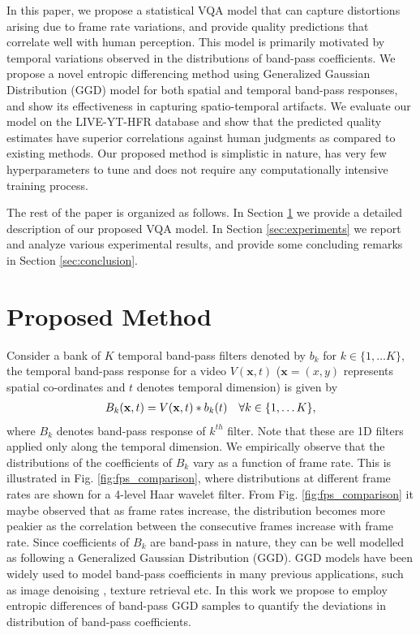 \documentclass[journal]{IEEEtran}
\begin{document}
In this paper, we propose a statistical VQA model that can capture distortions arising due to frame rate variations, and provide quality predictions that correlate well with human perception. This model is primarily motivated by temporal variations observed in the distributions of band-pass coefficients. We propose a novel entropic differencing method using Generalized Gaussian Distribution (GGD) model for both spatial and temporal band-pass responses, and show its effectiveness in capturing spatio-temporal artifacts. We evaluate our model on the LIVE-YT-HFR database and show that the predicted quality estimates have superior correlations against human judgments as compared to existing methods. Our proposed method is simplistic in nature, has very few hyperparameters to tune and does not require any computationally intensive training process. 

The rest of the paper is organized as follows. In Section \ref{sec:Objective_QA} we provide a detailed description of our proposed VQA model. In Section \ref{sec:experiments} we report and analyze various experimental results, and provide some concluding remarks in Section \ref{sec:conclusion}.

\section{Proposed Method}
\label{sec:Objective_QA}

Consider a bank of $K$ temporal band-pass filters denoted by $b_k$ for $k \in \{1,\ldots K\}$, the temporal band-pass response for a video $V(\mathbf{x},t)$ ($\mathbf{x} = (x,y)$ represents spatial co-ordinates and $t$ denotes temporal dimension) is given by
\begin{align}
    B_k(\mathbf{x},t) = V(\mathbf{x},t)*b_k(t) \text{\hspace{10pt}} \forall k \in \{1,\ldots K\},
\end{align}
where $B_k$ denotes band-pass response of $k^{th}$ filter. Note that these are 1D filters applied only along the temporal dimension. We empirically observe that the distributions of the coefficients of $B_k$ vary as a function of frame rate. This is illustrated in Fig. \ref{fig:fps_comparison}, where distributions at different frame rates are shown for a 4-level Haar wavelet filter. From Fig. \ref{fig:fps_comparison} it maybe observed that as frame rates increase, the distribution becomes more peakier as the correlation between the consecutive frames increase with frame rate. Since coefficients of $B_k$ are band-pass in nature, they can be well modelled as following a Generalized Gaussian Distribution (GGD). GGD models have been widely used to model band-pass coefficients in many previous applications, such as image denoising \cite{chang2000adaptive}, texture retrieval \cite{do2002wavelet} etc. In this work we propose to employ entropic differences of band-pass GGD samples to quantify the deviations in distribution of band-pass coefficients. 
\end{document}

